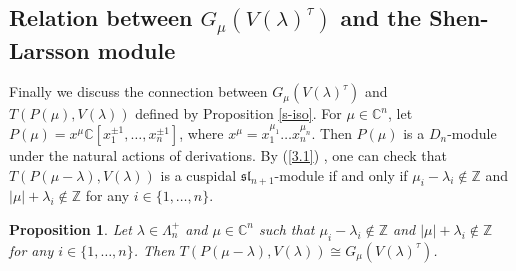 \documentclass[12pt,a4paper]{amsart}
\newtheorem{proposition}[theorem]{Proposition}%
\numberwithin{equation}{section}
\newcommand{\C}{\mathbb C}
\newcommand{\Z}{\mathbb{Z}}
\def\sl{\mathfrak{sl}}
\def\l{\lambda}
\begin{document}
\subsection{Relation between $G_{\mu}(V(\l)^\tau)$ and the Shen-Larsson module}

Finally we discuss  the connection between  $G_{\mu}(V(\l)^\tau)$ and $T(P(\mu),V(\l))$ defined by  Proposition \ref{s-iso}.
For $\mu \in \C^n$, let $P(\mu)=x^\mu\C[x_1^{\pm 1},\dots, x_n^{\pm 1}]$, where
$x^{\mu}=x_1^{\mu_1}\dots x_n^{\mu_n}$.  Then $P(\mu)$ is a $D_n$-module under the natural actions of derivations.
By (\ref{3.1}) , one can check that $T(P(\mu-\l),V(\l))$ is a cuspidal $\sl_{n+1}$-module if and only if $\mu_i-\l_i\not\in \Z$ and $|\mu|+\l_i\not\in \Z$  for any
$i\in \{1,\dots,n\}$.

\begin{proposition}
Let $\l\in \Lambda_n^+$ and  $\mu\in\C^n$ such that $\mu_i-\l_i\not\in \Z$ and $|\mu|+\l_i\not\in \Z$  for any
$i\in \{1,\dots,n\}$. Then
$T(P(\mu-\l),V(\l))\cong G_{\mu}(V(\l)^\tau)$.
\end{proposition}
\end{document}
